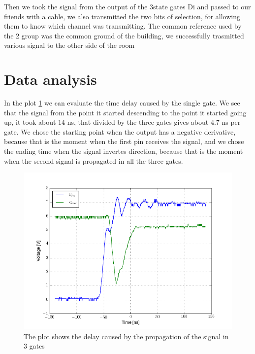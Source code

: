 Then we took the signal from the output of the 3state gates Di and passed to our friends with a cable, we also transmitted the two bits of selection, for allowing them to know which channel was transmitting. The common reference used by the 2 group was the common ground of the building, we successfully trasmitted various signal to the other side of the room 

\section{Data analysis}
In the plot \ref{latency_plot} we can evaluate the time delay caused by the single gate. We see that the signal from the point it started descending to the point it started going up, it took about 14 ns, that divided by the three gates gives about 4.7 ns per gate. We chose the starting point when the output has a negative derivative, because that is the moment when the first pin receives the signal, and we chose the ending time when the signal invertes direction, because that is the moment when the second signal is propagated in all the three gates.
\begin{figure}[H]
\centering
\includegraphics[width=.7\textwidth]{10/latency_plot.png}
\caption{The plot shows the delay caused by the propagation of the signal in 3 gates}\label{latency_plot}
\end{figure}
